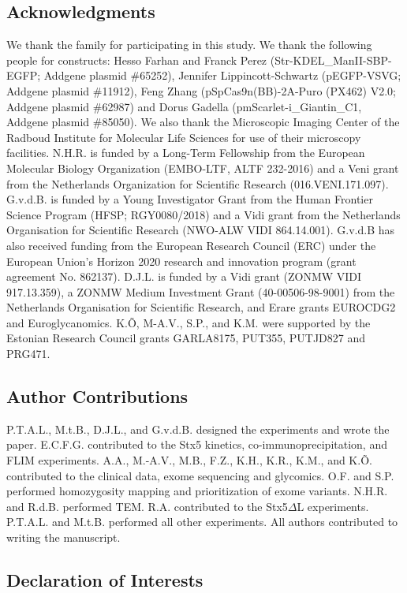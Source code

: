 \subsection{Acknowledgments}

We thank the family for participating in this study. We thank the following people for constructs: Hesso Farhan and Franck Perez (Str-KDEL\_ManII-SBP-EGFP; Addgene plasmid \#65252), Jennifer Lippincott-Schwartz (pEGFP-VSVG; Addgene plasmid \#11912), Feng Zhang (pSpCas9n(BB)-2A-Puro (PX462) V2.0; Addgene plasmid \#62987) and Dorus Gadella (pmScarlet-i\_Giantin\_C1, Addgene plasmid \#85050). We also thank the Microscopic Imaging Center of the Radboud Institute for Molecular Life Sciences for use of their microscopy facilities. N.H.R. is funded by a Long-Term Fellowship from the European Molecular Biology Organization (EMBO-LTF, ALTF 232-2016) and a Veni grant from the Netherlands Organization for Scientific Research (016.VENI.171.097). G.v.d.B. is funded by a Young Investigator Grant from the Human Frontier Science Program (HFSP; RGY0080/2018) and a Vidi grant from the Netherlands Organisation for Scientific Research (NWO-ALW VIDI 864.14.001). G.v.d.B has also received funding from the European Research Council (ERC) under the European Union’s Horizon 2020 research and innovation program (grant agreement No. 862137). D.J.L. is funded by a Vidi grant (ZONMW VIDI 917.13.359), a ZONMW Medium Investment Grant (40-00506-98-9001) from the Netherlands Organisation for Scientific Research, and Erare grants EUROCDG2 and Euroglycanomics. K.Õ, M-A.V., S.P., and K.M. were supported by the Estonian Research Council grants GARLA8175, PUT355, PUTJD827 and PRG471.

\subsection{Author Contributions}

P.T.A.L., M.t.B., D.J.L., and G.v.d.B. designed the experiments and wrote the paper. E.C.F.G. contributed to the Stx5 kinetics, co-immunoprecipitation, and FLIM experiments. A.A., M.-A.V., M.B., F.Z., K.H., K.R., K.M., and K.Õ. contributed to the clinical data, exome sequencing and glycomics. O.F. and S.P. performed homozygosity mapping and prioritization of exome variants. N.H.R. and R.d.B. performed TEM. R.A. contributed to the Stx5$\Delta$L experiments. P.T.A.L. and M.t.B. performed all other experiments. All authors contributed to writing the manuscript.

\subsection{Declaration of Interests}

